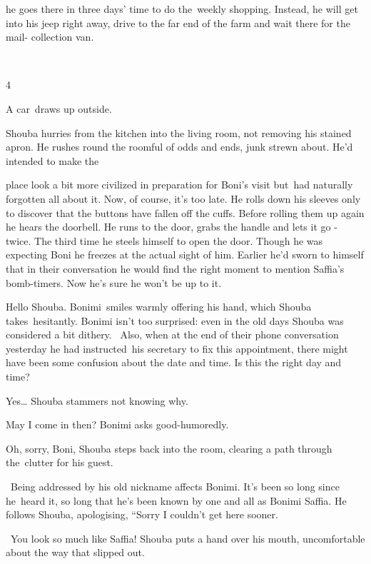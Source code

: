 \documentclass[12pt]{book}
\begin{document}
he goes there in three days' time to do the~weekly shopping. Instead, he will get into his jeep right away, drive to the
far end of the farm and wait there for the mail- collection van.

~

4

A car~draws up outside.{ }

Shouba hurries from the kitchen into the living room, not removing his stained apron. He rushes round the roomful of
odds and ends, junk strewn about. He'd intended to make the

place look a bit more civilized in preparation for Boni's visit but~had naturally forgotten all about it. Now, of
course, it's too late. He rolls down his sleeves only to discover that the buttons have fallen off the cuffs. Before
rolling them up again he hears the doorbell. He runs to the door, grabs the handle and lets it go - twice. The third
time he steels himself to open the door. Though he was expecting Boni he freezes at the actual sight of him. Earlier
he'd sworn to himself that in their conversation he would find the right moment to mention Saffia's bomb-timers. Now
he's sure he won't be up to it.

{\textquotedbl}Hello Shouba.{\textquotedbl} Bonimi~smiles warmly offering his hand, which Shouba takes~hesitantly.
Bonimi isn't too surprised: even in the old days Shouba was considered a bit dithery. \ Also, when at the end of their
phone conversation yesterday he had instructed~his secretary to fix this appointment, there might have been some
confusion about the date and time. {\textquotedbl}Is this the right day and time?{\textquotedbl}

{\textquotedbl}Yes{\dots}{\textquotedbl} Shouba stammers not knowing why.

{\textquotedbl}May I come in then?{\textquotedbl} Bonimi asks good-humoredly.

{\textquotedbl}Oh, sorry, Boni,{\textquotedbl} Shouba steps back into the room, clearing a path through the~clutter for
his guest.

~Being addressed by his old nickname affects Bonimi. It's been so long since he~heard it, so long that he's been known
by{ }one and all as Bonimi Saffia. He follows Shouba, apologising, ``Sorry I
couldn't get here sooner.{\textquotedbl}

~{\textquotedbl}You look so much like Saffia!{\textquotedbl} Shouba puts a hand over his mouth, uncomfortable about the
way that slipped out.
\end{document}
